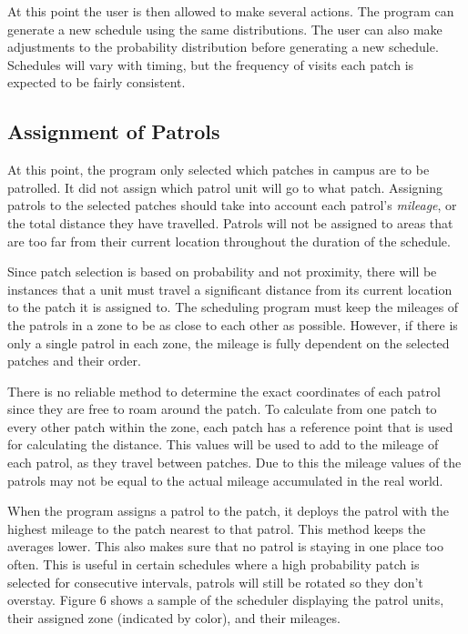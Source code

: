 \documentclass[journal]{./IEEE/IEEEtran}
\begin{document}
At this point the user is then allowed to make several actions. The program can generate a new schedule using the same distributions. The user can also make adjustments to the probability distribution before generating a new schedule. Schedules will vary with timing, but the frequency of visits each patch is expected to be fairly consistent.




\subsection{Assignment of Patrols}
At this point, the program only selected which patches in campus are to be patrolled. It did not assign which patrol unit will go to what patch. Assigning patrols to the selected patches should take into account each patrol's \textit{mileage}, or the total distance they have travelled. Patrols will not be assigned to areas that are too far from their current location throughout the duration of the schedule.

Since patch selection is based on probability and not proximity, there will be instances that a unit must travel a significant distance from its current location to the patch it is assigned to. The scheduling program must keep the mileages of the patrols in a zone to be as close to each other as possible. However, if there is only a single patrol in each zone, the mileage is fully dependent on the selected patches and their order.

There is no reliable method to determine the exact coordinates of each patrol since they are free to roam around the patch. To calculate from one patch to every other patch within the zone, each patch has a reference point that is used for calculating the distance. This values will be used to add to the mileage of each patrol, as they travel between patches. Due to this the mileage values of the patrols may not be equal to the actual mileage accumulated in the real world.

When the program assigns a patrol to the patch, it deploys the patrol with the highest mileage to the patch nearest to that patrol. This method keeps the averages lower. This also makes sure that no patrol is staying in one place too often. This is useful in certain schedules where a high probability patch is selected for consecutive intervals, patrols will still be rotated so they don't overstay. Figure 6 shows a sample of the scheduler displaying the patrol units, their assigned zone (indicated by color), and their mileages.
\end{document}
